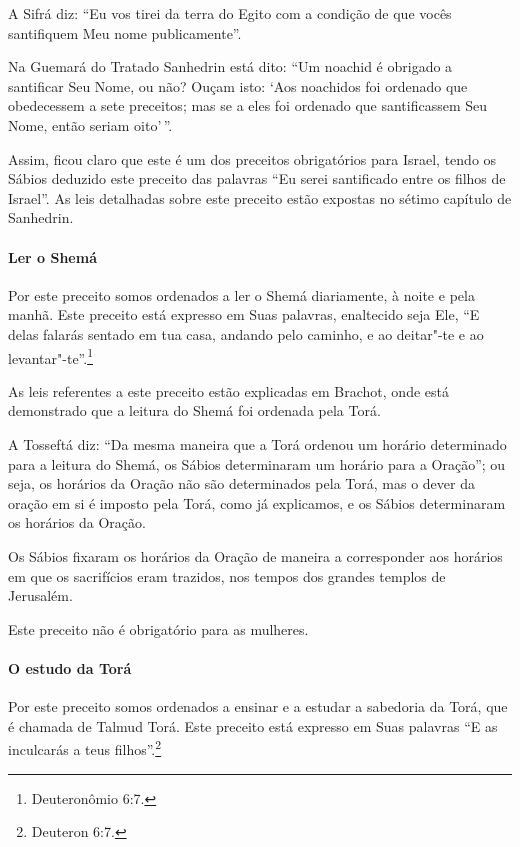 \begin{multicols}{2}
A Sifrá\starr{} diz: ``Eu vos tirei da terra do Egito com a condição de que
vocês santifiquem Meu nome publicamente''.

Na Guemará\starr{} do Tratado Sanhedrin\starr{} está dito: ``Um noachid\starr{} é obrigado a
santificar Seu Nome, ou não? Ouçam isto: `Aos noachidos\starr{} foi ordenado que obedecessem a sete preceitos; mas se a eles foi ordenado que
santificassem Seu Nome, então seriam oito'\,''.

Assim, ficou claro que este é um dos preceitos obrigatórios para
Israel, tendo os Sábios deduzido este preceito das palavras ``Eu serei
santificado entre os filhos de Israel''. As leis detalhadas sobre este
preceito estão expostas no sétimo capítulo de Sanhedrin\starr.

\paragraph{Ler o Shemá\starr}

Por este preceito somos ordenados a ler o Shemá\starr{} diariamente, à noite e
pela manhã. Este preceito está expresso em Suas palavras, enaltecido
seja Ele, ``E delas falarás sentado em tua casa, andando pelo caminho, e
ao deitar"-te e ao levantar"-te''.\footnote{Deuteronômio 6:7.}

As leis referentes a este preceito estão explicadas em Brachot\starr, onde
está demonstrado que a leitura do Shemá\starr{} foi ordenada pela Torá\starr.

A Tosseftá\starr{} diz: ``Da mesma maneira que a Torá\starr{} ordenou um horário
determinado para a leitura do Shemá\starr, os Sábios determinaram um horário
para a Oração''; ou seja, os horários da Oração não são determinados
pela Torá\starr, mas o dever da oração em si é imposto pela Torá\starr, como já
explicamos, e os Sábios determinaram os horários da Oração.

Os Sábios fixaram os horários da Oração de maneira a corresponder aos
horários em que os sacrifícios eram trazidos, nos tempos dos grandes
templos de Jerusalém.

Este preceito não é obrigatório para as mulheres.

\paragraph{O estudo da Torá\starr{}}

Por este preceito somos ordenados a ensinar e a estudar a sabedoria da
Torá\starr, que é chamada de Talmud Torá\starr. Este preceito está expresso em
Suas palavras ``E as inculcarás a teus filhos''.\footnote{Deuteron 6:7.}


\end{multicols}
